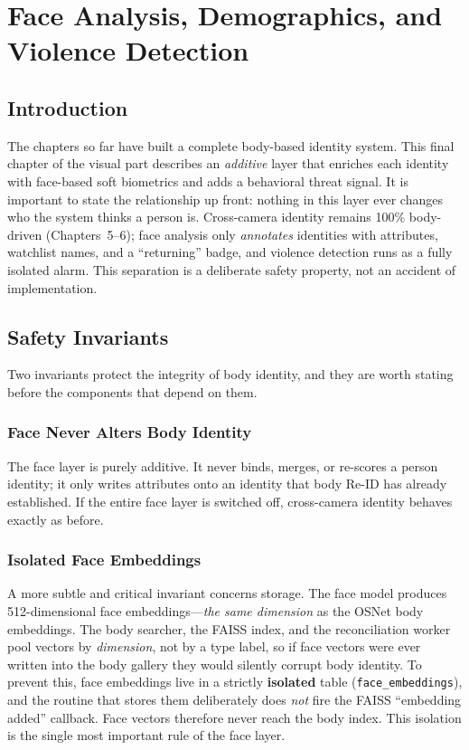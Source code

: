 \documentclass[12pt]{report}
\begin{document}
\newpage

\chapter{Face Analysis, Demographics, and Violence Detection}
\setcounter{section}{0}

\section{Introduction}
The chapters so far have built a complete body-based identity system. This final chapter of the visual part describes an \emph{additive} layer that enriches each identity with face-based soft biometrics and adds a behavioral threat signal. It is important to state the relationship up front: nothing in this layer ever changes who the system thinks a person is. Cross-camera identity remains 100\% body-driven (Chapters~5--6); face analysis only \emph{annotates} identities with attributes, watchlist names, and a ``returning'' badge, and violence detection runs as a fully isolated alarm. This separation is a deliberate safety property, not an accident of implementation.

\section{Safety Invariants}
Two invariants protect the integrity of body identity, and they are worth stating before the components that depend on them.

\subsection{Face Never Alters Body Identity}
The face layer is purely additive. It never binds, merges, or re-scores a person identity; it only writes attributes onto an identity that body Re-ID has already established. If the entire face layer is switched off, cross-camera identity behaves exactly as before.

\subsection{Isolated Face Embeddings}
A more subtle and critical invariant concerns storage. The face model produces 512-dimensional face embeddings---\emph{the same dimension} as the OSNet body embeddings. The body searcher, the FAISS index, and the reconciliation worker pool vectors by \emph{dimension}, not by a type label, so if face vectors were ever written into the body gallery they would silently corrupt body identity. To prevent this, face embeddings live in a strictly \textbf{isolated} table (\texttt{face\_embeddings}), and the routine that stores them deliberately does \emph{not} fire the FAISS ``embedding added'' callback. Face vectors therefore never reach the body index. This isolation is the single most important rule of the face layer.
\end{document}
